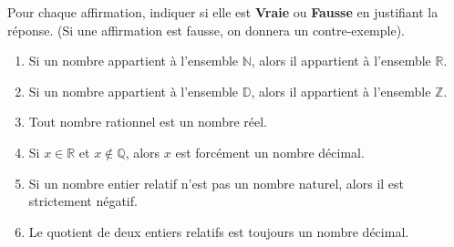 \begin{exo}{}
	Pour chaque affirmation, indiquer si elle est \textbf{Vraie} ou \textbf{Fausse} en justifiant la réponse. (Si une affirmation est fausse, on donnera un contre-exemple).

	\begin{enumerate}[label=\arabic*), itemsep=5pt]
		\item Si un nombre appartient à l'ensemble $\mathbb{N}$, alors il appartient à l'ensemble $\mathbb{R}$.
		\item Si un nombre appartient à l'ensemble $\mathbb{D}$, alors il appartient à l'ensemble $\mathbb{Z}$.
		\item Tout nombre rationnel est un nombre réel.
		\item Si $x \in \mathbb{R}$ et $x \notin \mathbb{Q}$, alors $x$ est forcément un nombre décimal.
		\item Si un nombre entier relatif n'est pas un nombre naturel, alors il est strictement négatif.
		\item Le quotient de deux entiers relatifs est toujours un nombre décimal.
	\end{enumerate}
\end{exo}
